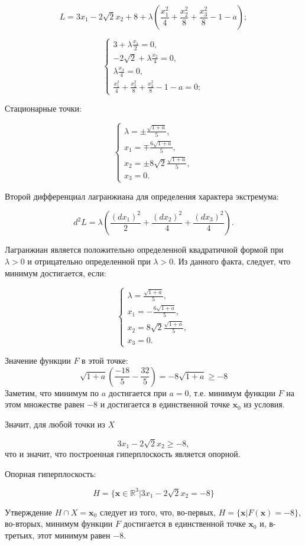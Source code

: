 \documentclass[12pt]{article}
\begin{document}
$$L = 3x_1 - 2\sqrt{2}x_2  + 8 + \lambda(\frac{x_1^2}{4}+\frac{x_2^2}{8}+\frac{x_3^2}{8} - 1 - a);$$

\begin{equation*}
 \begin{cases}
   3 + \lambda\frac{x_1}{2} = 0,\\
   -2\sqrt{2} + \lambda\frac{x_2}{4} = 0, \\
   \lambda\frac{x_3}{4} = 0, \\
   \frac{x_1^2}{4}+\frac{x_2^2}{8}+\frac{x_3^2}{8} - 1 - a = 0;
 \end{cases}
\end{equation*}

Стационарные точки:

\begin{equation*}
 \begin{cases}
  	\lambda = \pm\frac{\sqrt{1+a}}{5},\\
   x_1 = \mp\frac{6\sqrt{1+a}}{5}, \\
   x_2 = \pm8\sqrt{2}\frac{\sqrt{1+a}}{5}, \\
   x_3 = 0.
 \end{cases}
\end{equation*}

Второй дифференциал лагранжиана для определения характера экстремума:

$$d^2 L = \lambda\left(\frac{(dx_1)^2}{2} + \frac{(dx_2)^2}{4}+\frac{(dx_3)^2}{4}\right).$$

Лагранжиан является положительно определенной квадратичной формой при $\lambda > 0$ и отрицательно определенной при $\lambda > 0$. Из данного факта, следует, что минимум достигается, если:

\begin{equation*}
 \begin{cases}
  	\lambda = \frac{\sqrt{1+a}}{5},\\
   x_1 = -\frac{6\sqrt{1+a}}{5}, \\
   x_2 = 8\sqrt{2}\frac{\sqrt{1+a}}{5}, \\
   x_3 = 0.
 \end{cases}
\end{equation*}


 Значение функции $F$ в этой точке:
$$\sqrt{1+a}\left(\frac{-18}{5} - \frac{32}{5}\right) = -8\sqrt{1+a} \geq -8$$
Заметим, что минимум по $a$ достигается при $a = 0$, т.е. минимум функции $F$ на этом множестве равен $-8$ и достигается в единственной  точке $\textbf{x}_0$ из условия.

Значит, для любой точки из $X$ 

$$3x_1 - 2\sqrt{2}x_2 \geq -8,$$
что и значит, что построенная гиперплоскость является опорной.

Опорная гиперплоскость:

$$\boxed{H = \{\textbf{x}\in \mathbb{R}^3|3x_1 - 2\sqrt{2}x_2 = -8\}}$$

Утверждение $H \cap X = {\textbf{x}_0}$ следует из того, что, во-первых, $H = \{\textbf{x}|F(\textbf{x}) = -8\}$, во-вторых, минимум функции $F$ достигается в единственной точке $\textbf{x}_0$ и, в-третьих, этот минимум равен $-8$.
\end{document}
